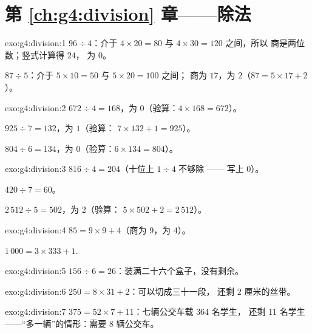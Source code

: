 \section*{第 \ref{ch:g4:division} 章——除法}

\begin{solution}{exo:g4:division:1}
$96 \div 4$：介于 $4 \times 20 = 80$ 与 $4 \times 30 = 120$ 之间，所以
商是两位数；竖式计算得 $24$，
为 $0$。

$87 \div 5$：介于 $5 \times 10 = 50$ 与 $5 \times 20 = 100$ 之间；
商为 $17$，为 $2$（$87 = 5 \times 17 + 2$）。
\end{solution}

\begin{solution}{exo:g4:division:2}
$672 \div 4 = 168$，为 $0$（验算：$4 \times 168 = 672$）。

$925 \div 7 = 132$，为 $1$（验算：
$7 \times 132 + 1 = 925$）。

$804 \div 6 = 134$，为 $0$（验算：$6 \times 134 = 804$）。
\end{solution}

\begin{solution}{exo:g4:division:3}
$816 \div 4 = 204$（十位上 $1 \div 4$ 不够除 ——
写上 $0$）。

$420 \div 7 = 60$。

$2\,512 \div 5 = 502$，为 $2$（验算：
$5 \times 502 + 2 = 2\,512$）。
\end{solution}

\begin{solution}{exo:g4:division:4}
$85 = 9 \times 9 + 4$（商为 $9$，为 $4$）。

$1\,000 = 3 \times 333 + 1$.
\end{solution}

\begin{solution}{exo:g4:division:5}
$156 \div 6 = 26$：装满二十六个盒子，没有剩余。
\end{solution}

\begin{solution}{exo:g4:division:6}
$250 = 8 \times 31 + 2$：可以切成三十一段，
还剩 $2$ 厘米的丝带。
\end{solution}

\begin{solution}{exo:g4:division:7}
$375 = 52 \times 7 + 11$：七辆公交车载 $364$ 名学生，
还剩 $11$ 名学生——“多一辆”的情形：需要 $8$ 辆公交车。
\end{solution}

